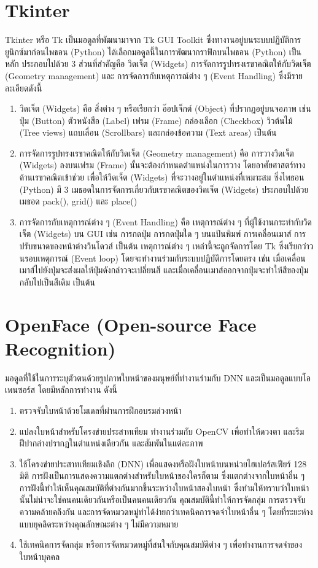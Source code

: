 \section{Tkinter}
Tkinter หรือ Tk เป็นมอดูลที่พัฒนามาจาก Tk GUI Toolkit ซึ่งทางานอยู่บนระบบปฏิบัติการยูนิกซ์มาก่อนไพธอน (Python) ได้เลือกมอดูลนี้ในการพัฒนากราฟิกบนไพธอน (Python) เป็นหลัก
ประกอบไปด้วย 3 ส่วนที่สำคัญคือ วิดเจ็ต (Widgets) การจัดการรูปทรงเรขาคณิตให้กับวิดเจ็ต (Geometry management) และ การจัดการกับเหตุการณ์ต่าง ๆ (Event Handling) \cite{Tkinter} ซึ่งมีรายละเอียดดังนี้
\begin{enumerate}
  \item วิดเจ็ต (Widgets) คือ สิ่งต่าง ๆ หรือเรียกว่า อ๊อปเจ็กต์ (Object) ที่ปรากฏอยู่บนจอภาพ เช่น ปุ่ม (Button) ตัวหนังสือ (Label) เฟรม (Frame) กล่องเลือก (Checkbox) 
  วิวต้นไม้ (Tree views) แถบเลื่อน (Scrollbars) และกล่องข้อความ (Text areas) เป็นต้น
  \item การจัดการรูปทรงเรขาคณิตให้กับวิดเจ็ต (Geometry management) คือ การวางวิดเจ็ต (Widgets) ลงบนเฟรม (Frame) นั้นจะต้องกำหนดตำแหน่งในการวาง 
  โดยอาศัยศาสตร์ทางด้านเรขาคณิตเข้าช่วย เพื่อให้วิดเจ็ต (Widgets) ที่จะวางอยู่ในตำแหน่งที่เหมาะสม ซึ่งไพธอน (Python) มี 3 เมธอดในการจัดการเกี่ยวกับเรขาคณิตของวิดเจ็ต (Widgets) 
  ประกอบไปด้วยเมธอด pack(), grid() และ place()
  \item การจัดการกับเหตุการณ์ต่าง ๆ (Event Handling)  คือ เหตุการณ์ต่าง ๆ ที่ผู้ใช้งานกระทำกับวิดเจ็ต (Widgets) บน GUI เช่น การกดปุ่ม การกดปุ่มใด ๆ บนแป้นพิมพ์ 
  การเคลื่อนเมาส์ การปรับขนาดของหน้าต่างวินโดวส์ เป็นต้น เหตุการณ์ต่าง ๆ เหล่านี้จะถูกจัดการโดย Tk ซึ่งเรียกว่าวนรอบเหตุการณ์ (Event loop) โดยจะทำงานร่วมกับระบบปฏิบัติการโดยตรง 
  เช่น เมื่อเคลื่อนเมาส์ไปยังปุ่มจะส่งผลให้ปุ่มดังกล่าวจะเปลี่ยนสี และเมื่อเคลื่อนเมาส์ออกจากปุ่มจะทำให้สีของปุ่มกลับไปเป็นสีเดิม เป็นต้น
\end{enumerate}

\section{OpenFace (Open-source Face Recognition)}
มอดูลที่ใช้ในการระบุตัวตนด้วยรูปภาพใบหน้าของมนุษย์ที่ทำงานร่ามกับ DNN และเป็นมอดูลแบบโอเพนซอร์ส \cite{amos2016openface} โดยมีหลักการทำงาน ดังนี้
\begin{enumerate}
  \item ตรวจจับใบหน้าด้วยโมเดลที่ผ่านการฝึกอบรมล่วงหน้า
  \item แปลงใบหน้าสำหรับโครงข่ายประสาทเทียม ทำงานร่วมกับ OpenCV เพื่อทำให้ดวงตา และริมฝีปากล่างปรากฏในตำแหน่งเดียวกัน และสัมพันในแต่ละภาพ
  \item ใช้โครงข่ายประสาทเทียมเชิงลึก (DNN) เพื่อแสดงหรือฝังใบหน้าบนหน่วยไฮเปอร์สเฟียร์ 128 มิติ การฝังเป็นการแสดงความแตกต่างสำหรับใบหน้าของใครก็ตาม 
  ซึ่งแตกต่างจากใบหน้าอื่น ๆ การฝังนี้ทำให้เห็นคุณสมบัติที่ต่างกันมากขึ้นระหว่างใบหน้าสองใบหน้า ซึ่งทำมให้ทราบว่าใบหน้านั้นไม่น่าจะใช่คนคนเดียวกันหรือเป็นคนคนเดียวกัน 
  คุณสมบัตินี้ทำให้การจัดกลุ่ม การตรวจจับความคล้ายคลึงกัน และการจัดหมวดหมู่ทำได้ง่ายกว่าเทคนิคการจดจำใบหน้าอื่น ๆ โดยที่ระยะห่างแบบยุคลิดระหว่างคุณลักษณะต่าง ๆ 
  ไม่มีความหมาย
  \item ใช้เทคนิคการจัดกลุ่ม หรือการจัดหมวดหมู่ที่สนใจกับคุณสมบัติต่าง ๆ เพื่อทำงานการจดจำของใบหน้าบุคคล 
\end{enumerate}  


